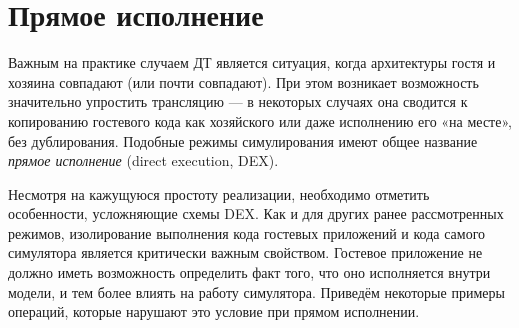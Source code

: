 \section{Прямое исполнение}\label{sec:dex}

Важным на практике случаем ДТ является ситуация, когда архитектуры гостя и хозяина совпадают (или почти совпадают). При этом возникает возможность значительно упростить трансляцию — в некоторых случаях она сводится к копированию гостевого кода как хозяйского или даже исполнению его «на месте», без дублирования. Подобные режимы симулирования имеют общее название \textit{прямое исполнение} (\abbr direct execution, DEX).

Несмотря на кажущуюся простоту реализации, необходимо отметить особенности, усложняющие схемы DEX. Как и для других ранее рассмотренных режимов, изолирование выполнения кода гостевых приложений и кода самого симулятора является критически важным свойством. Гостевое приложение не должно иметь возможность определить факт того, что оно исполняется внутри модели, и тем более влиять на работу симулятора. Приведём некоторые примеры операций, которые нарушают это условие при прямом исполнении.

